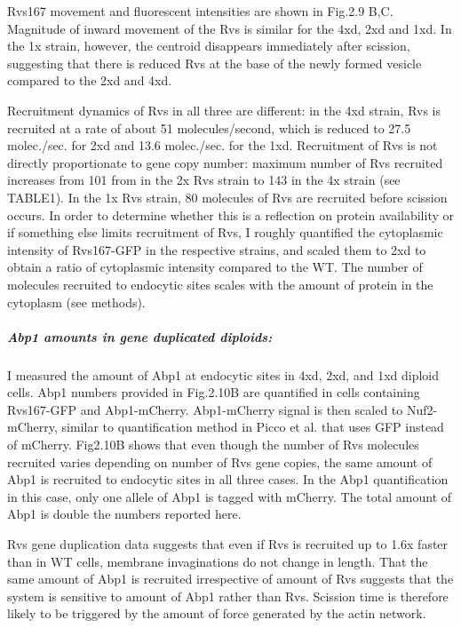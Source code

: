 Rvs167 movement and fluorescent intensities are shown in Fig.2.9 B,C. 
Magnitude of inward movement of the Rvs is similar for the 4xd, 2xd and 1xd. In the 1x strain, however, the centroid disappears immediately after scission, suggesting that there is reduced Rvs at the base of the newly formed vesicle compared to the 2xd and 4xd.

Recruitment dynamics of Rvs in all three are different: in the 4xd strain, Rvs is recruited at a rate of about 51 molecules/second, which is reduced to 27.5 molec./sec. for 2xd and 13.6 molec./sec. for the 1xd. Recruitment of Rvs is not directly proportionate to gene copy number: maximum number of Rvs recruited increases from 101 from in the 2x Rvs strain to 143 in the 4x strain (see TABLE1). In the 1x Rvs strain, 80 molecules of Rvs are recruited before scission occurs. In order to determine whether this is a reflection on protein availability or if something else limits recruitment of Rvs, I roughly quantified the cytoplasmic intensity of Rvs167-GFP in the respective strains, and scaled them to 2xd to obtain a ratio of cytoplasmic intensity compared to the WT. The number of molecules recruited to endocytic sites scales with the amount of protein in the cytoplasm (see methods).  




		\subparagraph{	Abp1 amounts in gene duplicated diploids:}
		I measured the amount of Abp1 at endocytic sites in 4xd, 2xd, and 1xd diploid cells. Abp1 numbers provided in Fig.2.10B are quantified in cells containing Rvs167-GFP and Abp1-mCherry.  Abp1-mCherry signal is then scaled to Nuf2-mCherry, similar to quantification method in Picco et al. that uses GFP instead of mCherry. Fig2.10B shows that even though the number of Rvs molecules recruited varies depending on number of Rvs gene copies, the same amount of Abp1 is recruited to endocytic sites in all three cases. In the Abp1 quantification in this case, only one allele of Abp1 is tagged with mCherry. The total amount of Abp1 is double the numbers reported here. 

Rvs gene duplication data suggests that even if Rvs is recruited up to 1.6x faster than in WT cells, membrane invaginations do not change in length. That the same amount of Abp1 is recruited irrespective of amount of Rvs suggests that the system is sensitive to amount of Abp1 rather than Rvs. Scission time is therefore likely to be triggered by the amount of force generated by the actin network. 



